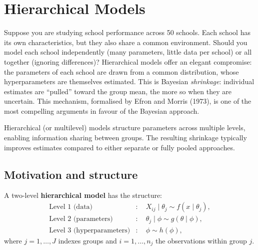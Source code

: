 \chapter{Hierarchical Models}
\label{ch:hierarchical}

Suppose you are studying school performance across 50 schools. Each school has its own characteristics, but they also share a common environment. Should you model each school independently (many parameters, little data per school) or all together (ignoring differences)? Hierarchical models offer an elegant compromise: the parameters of each school are drawn from a common distribution, whose hyperparameters are themselves estimated. This is Bayesian \emph{shrinkage}: individual estimates are ``pulled'' toward the group mean, the more so when they are uncertain. This mechanism, formalised by Efron and Morris (1973), is one of the most compelling arguments in favour of the Bayesian approach.

\begin{intuition}[title=\textbf{Central idea}]
Hierarchical (or multilevel) models structure parameters across multiple
levels, enabling information sharing between groups. The resulting
shrinkage typically improves estimates compared to either separate or
fully pooled approaches.
\end{intuition}

\section{Motivation and structure}

\begin{definition}
A two-level \textbf{hierarchical model} has the structure:
\begin{align*}
  \text{Level 1 (data)} &: \quad X_{ij} \mid \theta_j \sim f(x \mid \theta_j), \\
  \text{Level 2 (parameters)} &: \quad \theta_j \mid \phi \sim g(\theta \mid \phi), \\
  \text{Level 3 (hyperparameters)} &: \quad \phi \sim h(\phi),
\end{align*}
where $j = 1, \ldots, J$ indexes groups and $i = 1, \ldots, n_j$ the
observations within group $j$.
\end{definition}

